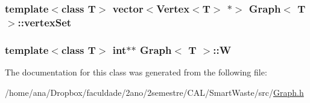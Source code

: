 \subsubsection[{\texorpdfstring{vertex\+Set}{vertexSet}}]{\setlength{\rightskip}{0pt plus 5cm}template$<$class T$>$ vector$<${\bf Vertex}$<$T$>$ $\ast$$>$ {\bf Graph}$<$ T $>$\+::vertex\+Set\hspace{0.3cm}{\ttfamily [private]}}\hypertarget{classGraph_a73d4e735fc0a7c83c9c689a2b53fa623}{}\label{classGraph_a73d4e735fc0a7c83c9c689a2b53fa623}
\subsubsection[{\texorpdfstring{W}{W}}]{\setlength{\rightskip}{0pt plus 5cm}template$<$class T$>$ int$\ast$$\ast$ {\bf Graph}$<$ T $>$\+::W\hspace{0.3cm}{\ttfamily [private]}}\hypertarget{classGraph_a20edce9af2c8ea8725ccbb5201eace38}{}\label{classGraph_a20edce9af2c8ea8725ccbb5201eace38}


The documentation for this class was generated from the following file\+:\begin{DoxyCompactItemize}
\item 
/home/ana/\+Dropbox/faculdade/2ano/2semestre/\+C\+A\+L/\+Smart\+Waste/src/\hyperlink{Graph_8h}{Graph.\+h}\end{DoxyCompactItemize}
